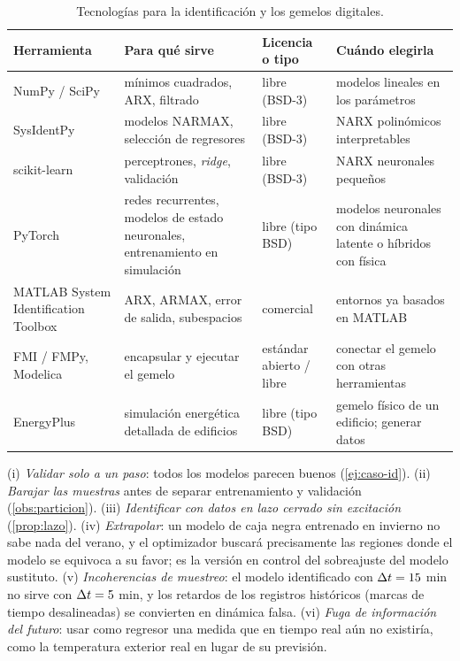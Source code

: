 \begin{table}[htbp]
\centering\footnotesize
\begin{tabularx}{\textwidth}{@{}>{\raggedright\arraybackslash}p{3.1cm}>{\raggedright\arraybackslash}X>{\raggedright\arraybackslash}p{2.0cm}>{\raggedright\arraybackslash}X@{}}
\toprule
Herramienta & Para qué sirve & Licencia o tipo & Cuándo elegirla \\
\midrule
NumPy / SciPy & mínimos cuadrados, ARX, filtrado & libre (BSD-3) & modelos lineales en los parámetros \\
SysIdentPy & modelos NARMAX, selección de regresores & libre (BSD-3) & NARX polinómicos interpretables \\
scikit-learn & perceptrones, \emph{ridge}, validación & libre (BSD-3) & NARX neuronales pequeños \\
PyTorch & redes recurrentes, modelos de estado neuronales, entrenamiento en simulación & libre (tipo BSD) & modelos neuronales con dinámica latente o híbridos con física \\
MATLAB System Identification Toolbox & ARX, ARMAX, error de salida, subespacios & comercial & entornos ya basados en MATLAB \\
FMI / FMPy, Modelica & encapsular y ejecutar el gemelo & estándar abierto / libre & conectar el gemelo con otras herramientas \\
EnergyPlus~\cite{crawley} & simulación energética detallada de edificios & libre (tipo BSD) & gemelo físico de un edificio; generar datos \\
\bottomrule
\end{tabularx}
\caption{Tecnologías para la identificación y los gemelos digitales.}
\label{tab:tec2}
\end{table}

\begin{observacion}\label{obs:errores2}
(i) \emph{Validar solo a un paso}: todos los modelos parecen buenos (\cref{ej:caso-id}). (ii) \emph{Barajar las muestras} antes de separar entrenamiento y validación (\cref{obs:particion}). (iii) \emph{Identificar con datos en lazo cerrado sin excitación} (\cref{prop:lazo}). (iv) \emph{Extrapolar}: un modelo de caja negra entrenado en invierno no sabe nada del verano, y el optimizador buscará precisamente las regiones donde el modelo se equivoca a su favor; es la versión en control del sobreajuste del modelo sustituto. (v) \emph{Incoherencias de muestreo}: el modelo identificado con $\Delta t=15$ min no sirve con $\Delta t=5$ min, y los retardos de los registros históricos (marcas de tiempo desalineadas) se convierten en dinámica falsa. (vi) \emph{Fuga de información del futuro}: usar como regresor una medida que en tiempo real aún no existiría, como la temperatura exterior real en lugar de su previsión.
\end{observacion}

